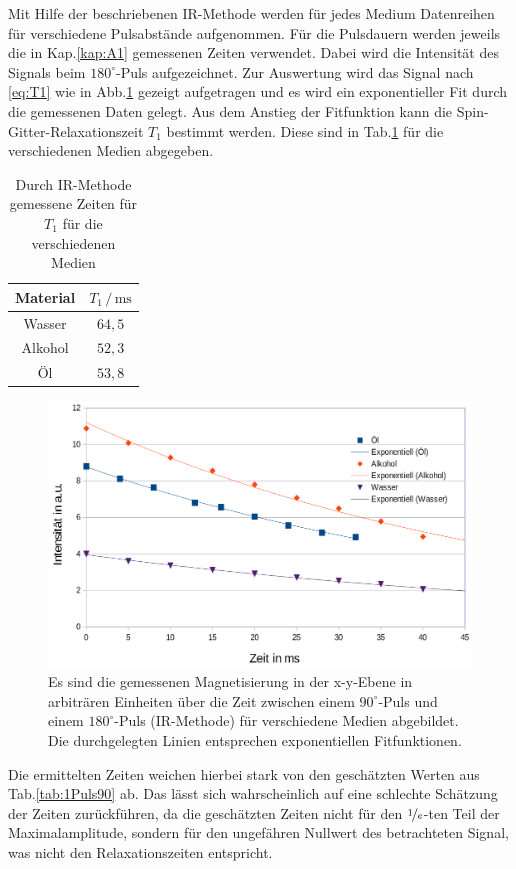 \documentclass[numbers=noenddot,a4paper,notitlepage,twoside,BCOR15mm]{scrartcl}
\begin{document}
	Mit Hilfe der beschriebenen IR-Methode werden für jedes Medium Datenreihen für verschiedene Pulsabstände aufgenommen. Für die Pulsdauern werden jeweils die in Kap.\ref{kap:A1} gemessenen Zeiten verwendet. Dabei wird die Intensität des Signals beim $180^\circ$-Puls aufgezeichnet. Zur Auswertung wird das Signal nach \eqref{eq:T1} wie in Abb.\ref{abb:T1} gezeigt aufgetragen und es wird ein exponentieller Fit durch die gemessenen Daten gelegt. Aus dem Anstieg der Fitfunktion kann die Spin-Gitter-Relaxationszeit $T_1$ bestimmt werden. Diese sind in Tab.\ref{tab:1T1} für die verschiedenen Medien abgegeben.
	
		\begin{table}[h]
			\centering
			\caption{Durch IR-Methode gemessene Zeiten für $T_1$ für die verschiedenen Medien}
			\begin{tabular}{c c}
				Material & $T_1\,/\,\mathrm{ms}$  \\ \hline
				Wasser 	& $64,5$  \\
				Alkohol & $52,3$  \\
				Öl 		& $53,8$ 
			\end{tabular}
			\label{tab:1T1}
		\end{table}
	
		\begin{figure}[h]
			\centering
			\includegraphics[width=1\textwidth]{pics/T1}
			\caption{Es sind die gemessenen Magnetisierung in der x-y-Ebene in arbiträren Einheiten über die Zeit zwischen einem $90^\circ$-Puls und einem $180^\circ$-Puls (IR-Methode) für verschiedene Medien abgebildet. Die durchgelegten Linien entsprechen exponentiellen Fitfunktionen.}
			\label{abb:T1}
		\end{figure}
		
			Die ermittelten Zeiten weichen hierbei stark von den geschätzten Werten aus Tab.\ref{tab:1Puls90} ab. Das lässt sich wahrscheinlich auf eine schlechte Schätzung der Zeiten zurückführen, da die geschätzten Zeiten nicht für den $\nicefrac{1}{e}$-ten Teil der Maximalamplitude, sondern für den ungefähren  Nullwert des betrachteten Signal, was nicht den Relaxationszeiten entspricht.
		
\end{document}
